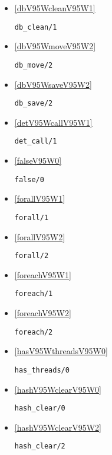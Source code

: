 \begin{itemize}
\item \ref{dbV95WcleanV95W1} 
\begin{verbatim}
db_clean/1
\end{verbatim}

\item \ref{dbV95WmoveV95W2} 
\begin{verbatim}
db_move/2
\end{verbatim}

\item \ref{dbV95WsaveV95W2} 
\begin{verbatim}
db_save/2
\end{verbatim}

\item \ref{detV95WcallV95W1} 
\begin{verbatim}
det_call/1
\end{verbatim}

\item \ref{falseV95W0} 
\begin{verbatim}
false/0
\end{verbatim}

\item \ref{forallV95W1} 
\begin{verbatim}
forall/1
\end{verbatim}

\item \ref{forallV95W2} 
\begin{verbatim}
forall/2
\end{verbatim}

\item \ref{foreachV95W1} 
\begin{verbatim}
foreach/1
\end{verbatim}

\item \ref{foreachV95W2} 
\begin{verbatim}
foreach/2
\end{verbatim}

\item \ref{hasV95WthreadsV95W0} 
\begin{verbatim}
has_threads/0
\end{verbatim}

\item \ref{hashV95WclearV95W0} 
\begin{verbatim}
hash_clear/0
\end{verbatim}

\item \ref{hashV95WclearV95W2} 
\begin{verbatim}
hash_clear/2
\end{verbatim}


\end{itemize}
